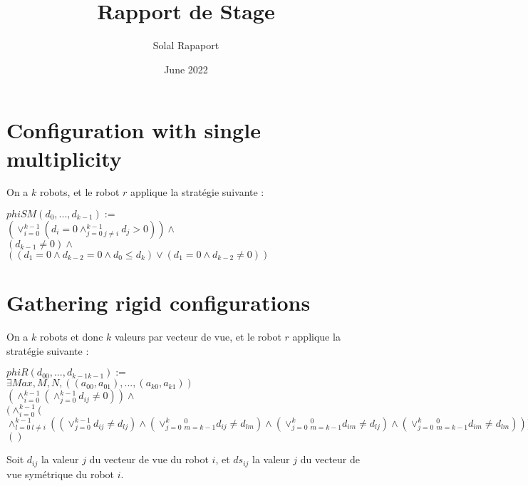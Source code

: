 \documentclass{article}
\title{Rapport de Stage}
\author{Solal Rapaport }
\date{June 2022}
\begin{document}
\maketitle

\section{Configuration with single multiplicity}

On a $k$ robots, et le robot $r$ applique la stratégie suivante :
\begin{center}
$phiSM(d_0, ..., d_{k-1}):=$\\
$(\lor_{i=0}^{k-1}(d_i = 0\land_{j=0\ j\not=i}^{k-1} d_j > 0))\land$\\
$(d_{k-1} \not= 0) \land $\\
$((d_1 = 0 \land d_{k-2} = 0 \land d_0 \leq d_k) \lor (d_1 = 0 \land d_{k-2} \not= 0))$
\end{center}

\section{Gathering rigid configurations}

On a $k$ robots et donc $k$ valeurs par vecteur de vue, et le robot $r$ applique la stratégie suivante :
\begin{center}
$phiR(d_{00}, ...,d_{k-1k-1}):=$\\
$\exists Max, M, N, ((a_{00}, a_{01}), ..., (a_{k0}, a_{k1}))$\\
$(\land_{i=0}^{k-1}(\land_{j=0}^{k-1}d_{ij}\not=0))\land $\\
$( \land_{i=0}^{k-1}($
$\land_{l=0\ l\not=i}^{k-1}(
(\lor_{j=0}^{k-1}d_{ij} \not= d_{lj})
\land (\lor_{j=0}^{k}_{m=k-1}^{0}d_{ij} \not= d_{lm})
\land (\lor_{j=0}^{k}_{m=k-1}^{0}d_{im} \not= d_{lj})
\land (\lor_{j=0}^{k}_{m=k-1}^{0}d_{im} \not= d_{lm}) 
) ))\land$\\
$()$
\end{center}

Soit $d_{ij}$ la valeur $j$ du vecteur de vue du robot $i$, et $ds_{ij}$ la valeur $j$ du vecteur de vue symétrique du robot $i$.
\end{document}

